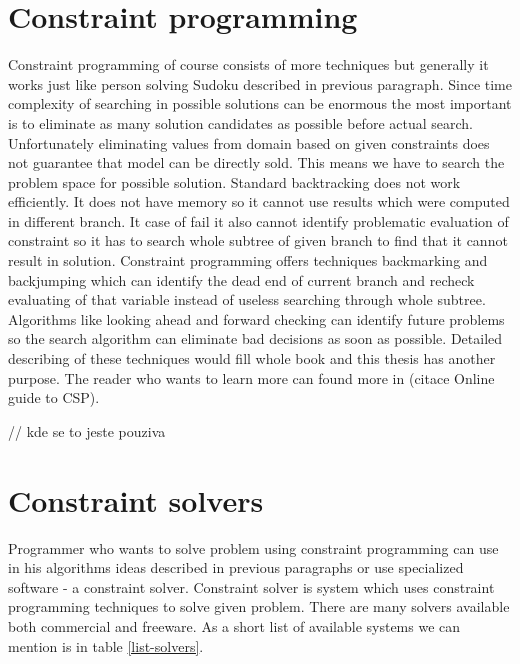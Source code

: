 \section{Constraint programming}
Constraint programming of course consists of more techniques but generally it works just like person solving Sudoku described in previous paragraph. Since time complexity of searching in possible solutions can be enormous the most important is to eliminate as many solution candidates as possible before actual search. Unfortunately eliminating values from domain based on given constraints does not guarantee that model can be directly sold. This means we have to search the problem space for possible solution. Standard backtracking does not work efficiently. It does not have memory so it cannot use results which were computed in different branch. It case of fail it also cannot identify problematic evaluation of constraint so it has to search whole subtree of given branch to find that it cannot result in solution. Constraint programming offers techniques backmarking and backjumping which can identify the dead end of current branch and recheck evaluating of that variable instead of useless searching through whole subtree. Algorithms like looking ahead and forward checking can identify future problems so the search algorithm can eliminate bad decisions as soon as possible. Detailed describing of these techniques would fill whole book and this thesis has another purpose. The reader who wants to learn more can found more in (citace Online guide to CSP).

// kde se to jeste pouziva

\section{Constraint solvers}
Programmer who wants to solve problem using constraint programming can use in his algorithms ideas described in previous paragraphs or use specialized software - a constraint solver. Constraint solver is system which uses constraint programming techniques to solve given problem. There are many solvers available both commercial and freeware. As a short list of available systems we can mention is in table \ref{list-solvers}.

